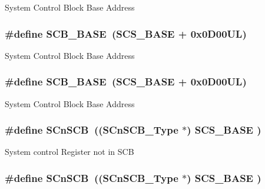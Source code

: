 System Control Block Base Address \hypertarget{group___c_m_s_i_s__core__register_gad55a7ddb8d4b2398b0c1cfec76c0d9fd}{
\subsubsection[{S\-C\-B\-\_\-\-B\-A\-S\-E}]{\setlength{\rightskip}{0pt plus 5cm}\#define S\-C\-B\-\_\-\-B\-A\-S\-E~({\bf S\-C\-S\-\_\-\-B\-A\-S\-E} +  0x0\-D00\-U\-L)}}\label{group___c_m_s_i_s__core__register_gad55a7ddb8d4b2398b0c1cfec76c0d9fd}
System Control Block Base Address \hypertarget{group___c_m_s_i_s__core__register_gad55a7ddb8d4b2398b0c1cfec76c0d9fd}{
\subsubsection[{S\-C\-B\-\_\-\-B\-A\-S\-E}]{\setlength{\rightskip}{0pt plus 5cm}\#define S\-C\-B\-\_\-\-B\-A\-S\-E~({\bf S\-C\-S\-\_\-\-B\-A\-S\-E} +  0x0\-D00\-U\-L)}}\label{group___c_m_s_i_s__core__register_gad55a7ddb8d4b2398b0c1cfec76c0d9fd}
System Control Block Base Address \hypertarget{group___c_m_s_i_s__core__register_ga9fe0cd2eef83a8adad94490d9ecca63f}{
\subsubsection[{S\-Cn\-S\-C\-B}]{\setlength{\rightskip}{0pt plus 5cm}\#define S\-Cn\-S\-C\-B~(({\bf S\-Cn\-S\-C\-B\-\_\-\-Type}    $\ast$)     {\bf S\-C\-S\-\_\-\-B\-A\-S\-E}      )}}\label{group___c_m_s_i_s__core__register_ga9fe0cd2eef83a8adad94490d9ecca63f}
System control Register not in S\-C\-B \hypertarget{group___c_m_s_i_s__core__register_ga9fe0cd2eef83a8adad94490d9ecca63f}{
\subsubsection[{S\-Cn\-S\-C\-B}]{\setlength{\rightskip}{0pt plus 5cm}\#define S\-Cn\-S\-C\-B~(({\bf S\-Cn\-S\-C\-B\-\_\-\-Type}    $\ast$)     {\bf S\-C\-S\-\_\-\-B\-A\-S\-E}      )}}\label{group___c_m_s_i_s__core__register_ga9fe0cd2eef83a8adad94490d9ecca63f}
